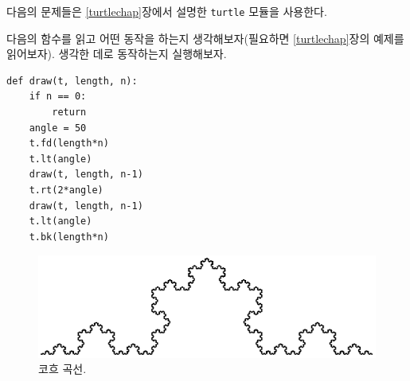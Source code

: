 \documentclass[10pt]{book}
\begin{document}
다음의 문제들은 \ref{turtlechap}장에서 설명한 {\tt turtle} 모듈을 사용한다. 

\begin{exercise}
 
다음의 함수를 읽고 어떤 동작을 하는지 생각해보자(필요하면
\ref{turtlechap}장의 예제를 읽어보자).  생각한 데로 동작하는지
실행해보자.


\begin{verbatim}
def draw(t, length, n):
    if n == 0:
        return
    angle = 50
    t.fd(length*n)
    t.lt(angle)
    draw(t, length, n-1)
    t.rt(2*angle)
    draw(t, length, n-1)
    t.lt(angle)
    t.bk(length*n)
\end{verbatim}

\end{exercise}


\begin{figure}
\centerline
{\includegraphics[scale=0.8]{figs/koch.pdf}}
\caption{코흐 곡선.}
\label{fig.koch}
\end{figure}
\end{document}

